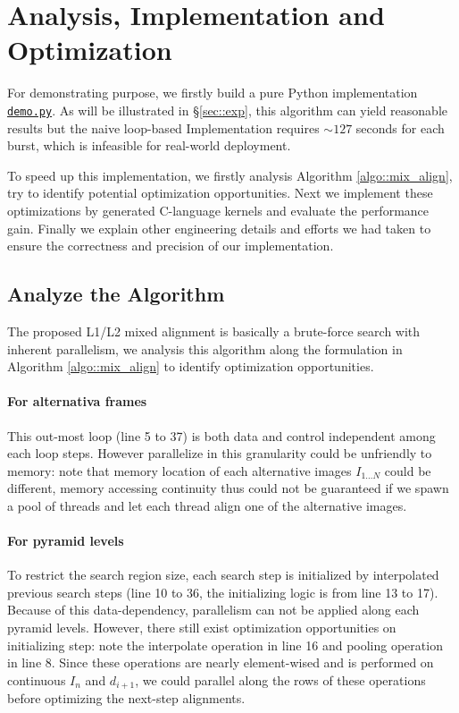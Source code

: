 \documentclass[conference, 10pt]{IEEEtran}
\begin{document}
\section{Analysis, Implementation and Optimization} \label{sec::imp}

For demonstrating purpose, we firstly build a pure Python implementation 
\href{https://github.com/CrazyRundong/burst-align/blob/master/demo.py}{\texttt{demo.py}}.
As will be illustrated in \S \ref{sec::exp}, this algorithm can yield reasonable results
but the naive loop-based Implementation requires $\sim 127$ seconds for each burst,
which is infeasible for real-world deployment.

To speed up this implementation, we firstly analysis Algorithm \ref{algo::mix_align}, try to
identify potential optimization opportunities. Next we implement these optimizations by generated
C-language kernels and evaluate the performance gain. Finally we explain other engineering details
and efforts we had taken to ensure the correctness and precision of our implementation.

\subsection{Analyze the Algorithm} \label{sec::analyze}

The proposed L1/L2 mixed alignment is basically a brute-force search with inherent
parallelism, we analysis this algorithm along the formulation in 
Algorithm \ref{algo::mix_align} to identify optimization opportunities.

\paragraph{For alternativa frames} This out-most loop (line 5 to 37) is both data and control independent
among each loop steps. However parallelize in this granularity could be unfriendly
to memory: note that memory location of each alternative images $I_{1 \ldots N}$
could be different, memory accessing continuity thus could not be guaranteed if we
spawn a pool of threads and let each thread align one of the alternative images.

\paragraph{For pyramid levels} To restrict the search region size, each search step is initialized by
interpolated previous search steps (line 10 to 36, the initializing
logic is from line 13 to 17). Because of this data-dependency, parallelism can not
be applied along each pyramid levels. However, there still exist optimization opportunities
on initializing step: note the interpolate operation in line 16 and pooling operation in
line 8. Since these operations are nearly element-wised and is performed on continuous
$I_n$ and $d_{i+1}$, we could parallel along the rows of these operations before
optimizing the next-step alignments.
\end{document}
